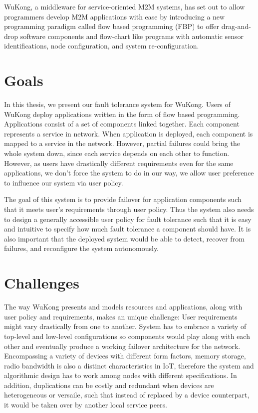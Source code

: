 WuKong, a middleware for service-oriented M2M systems, has set out to allow
programmers develop M2M applications with ease by introducing a new
programming paradigm called flow based programming (FBP) to offer drag-and-drop
software components and flow-chart like programs with automatic sensor
identifications, node configuration, and system re-configuration.~\cite{Reijers}



\section{Goals} %

In this thesis, we present our fault tolerance system for WuKong.
Users of WuKong deploy applications written in the form of flow based
programming. Applications consist of a set of components linked together.  Each
component represents a service in network. When application is deployed, each
component is mapped to a service in the network. However, partial failures could
bring the whole system down, since each service depends on each other to
function. However, as users have drastically different requirements even for the
same applications, we don't force the system to do in our way, we allow user
preference to influence our system via user policy. 

The goal of this system is to provide failover for application components such
that it meets user's requirements through user policy. Thus the system also
needs to design a generally accessible user policy for fault tolerance such that
it is easy and intuitive to specify how much fault tolerance a component should
have. It is also important that the deployed system would be able to detect,
  recover from failures, and reconfigure the system autonomously. 


\section{Challenges}

The way WuKong presents and models resources and applications, along with user
policy and requirements, makes an unique challenge: User requirements might
vary drastically from one to another. System has to embrace a variety of
top-level and low-level configurations so components would play along with each
other and eventually produce a working failover architecture for the network.
Encompassing a variety of devices with different form factors, memory storage,
radio bandwidth is also a distinct characteristics in IoT,
therefore the system and algorithmic design has to work among nodes
with different specifications. In addition, duplications can be
costly and redundant when devices are heterogeneous or versaile,
such that instead of replaced by a device counterpart, it would be
taken over by another local service peers.

